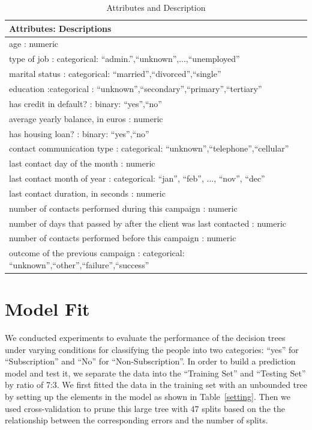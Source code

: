 \documentclass[letter]{article}
\begin{document}
\begin{table}[!htbp]
\centering
\caption{Attributes and Description}\label{table1}
\begin{tabular}{l}
\hline
\hline
Attributes: Descriptions\\
\midrule
age : numeric\\
type of job : categorical: ``admin.'',``unknown'',...,``unemployed''\\
marital status : categorical: ``married'',``divorced'',``single''\\
education :categorical : ``unknown'',``secondary'',``primary'',``tertiary''\\
has credit in default? : binary: ``yes'',``no''\\
average yearly balance, in euros : numeric\\
has housing loan? : binary: ``yes'',``no''\\
contact communication type : categorical: ``unknown'',``telephone'',``cellular''\\
last contact day of the month : numeric\\
last contact month of year : categorical: ``jan'', ``feb'', ..., ``nov'', ``dec''\\
last contact duration, in seconds : numeric\\
number of contacts performed during this campaign : numeric\\
number of days that passed by after the client was last contacted : numeric\\
number of contacts performed before this campaign : numeric\\
outcome of the previous campaign : categorical: ``unknown'',``other'',``failure'',``success''\\
\hline
\hline
\end{tabular}
\end{table}


\section{Model Fit}
We conducted experiments to evaluate the performance of the decision trees 
under varying conditions for classifying the people into two categories: 
``yes'' for ``Subscription'' and ``No'' for ``Non-Subscription''. In order 
to build a prediction model and test it, we separate the data into the 
``Training Set'' and ``Testing Set'' by ratio of 7:3. We first fitted the 
data in the training set with an unbounded tree by setting up the elements
in the model as shown in Table~\ref{setting}. Then we used cross-validation
to prune this large tree with 47 splits based on the the relationship 
between the corresponding errors and the number of splits.
\end{document}
